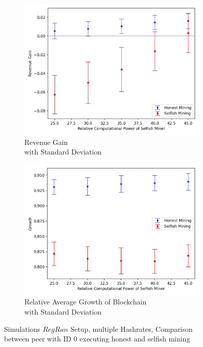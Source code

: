 \begin{figure}[tbp]
	 \begin{subfigure}[b]{0.5\textwidth}
		\includegraphics[width=\textwidth]{figures/rev_and_bpr_per_peer.png}
		\caption{Revenue Gain\\ with Standard Deviation}
		\label{fig:multi_hr}
	\end{subfigure}
	\hfill
	\begin{subfigure}[b]{0.5\textwidth}
		\includegraphics[width=\textwidth]{figures/growth.png}
		\caption{Relative Average Growth of Blockchain \\with Standard Deviation}
		\label{fig:multi_hr_growth}
	\end{subfigure}
	\caption{Simulations $RegRan$ Setup, multiple Hashrates, Comparison between peer with ID $0$ executing honest and selfish mining}
	\label{fig:mhr}
\end{figure}
